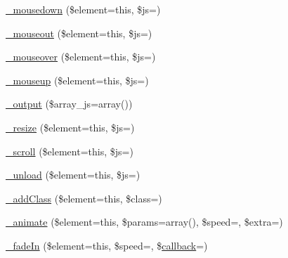 \begin{DoxyCompactItemize}
\item 
\mbox{\hyperlink{class_c_i___jquery_a95cb3f44c2413b0fbe51734b346f4d92}{\+\_\+mousedown}} (\$element=\textquotesingle{}this\textquotesingle{}, \$js=\textquotesingle{}\textquotesingle{})
\item 
\mbox{\hyperlink{class_c_i___jquery_a8a575b3b64cda3a24434e8fed1553124}{\+\_\+mouseout}} (\$element=\textquotesingle{}this\textquotesingle{}, \$js=\textquotesingle{}\textquotesingle{})
\item 
\mbox{\hyperlink{class_c_i___jquery_abe38c17415cf07abb6de435525676dca}{\+\_\+mouseover}} (\$element=\textquotesingle{}this\textquotesingle{}, \$js=\textquotesingle{}\textquotesingle{})
\item 
\mbox{\hyperlink{class_c_i___jquery_a78d654cce0aaa6de766809e56b727261}{\+\_\+mouseup}} (\$element=\textquotesingle{}this\textquotesingle{}, \$js=\textquotesingle{}\textquotesingle{})
\item 
\mbox{\hyperlink{class_c_i___jquery_a6a837913fb7adb3e611aa97a89d56a6e}{\+\_\+output}} (\$array\+\_\+js=array())
\item 
\mbox{\hyperlink{class_c_i___jquery_a6a056a14d5944d85fa6e198c609df475}{\+\_\+resize}} (\$element=\textquotesingle{}this\textquotesingle{}, \$js=\textquotesingle{}\textquotesingle{})
\item 
\mbox{\hyperlink{class_c_i___jquery_a8242a35dd382dd24e4bb7eaba2be2982}{\+\_\+scroll}} (\$element=\textquotesingle{}this\textquotesingle{}, \$js=\textquotesingle{}\textquotesingle{})
\item 
\mbox{\hyperlink{class_c_i___jquery_a967b2d5e889abc76a2389f2c34df14f7}{\+\_\+unload}} (\$element=\textquotesingle{}this\textquotesingle{}, \$js=\textquotesingle{}\textquotesingle{})
\item 
\mbox{\hyperlink{class_c_i___jquery_ac51392df39f9adbe6638324664c6319e}{\+\_\+add\+Class}} (\$element=\textquotesingle{}this\textquotesingle{}, \$class=\textquotesingle{}\textquotesingle{})
\item 
\mbox{\hyperlink{class_c_i___jquery_a0bec4feda29c0c883eccf40af8545c8c}{\+\_\+animate}} (\$element=\textquotesingle{}this\textquotesingle{}, \$params=array(), \$speed=\textquotesingle{}\textquotesingle{}, \$extra=\textquotesingle{}\textquotesingle{})
\item 
\mbox{\hyperlink{class_c_i___jquery_a2d323b3e6a8e62d1a940cbf58e216992}{\+\_\+fade\+In}} (\$element=\textquotesingle{}this\textquotesingle{}, \$speed=\textquotesingle{}\textquotesingle{}, \$\mbox{\hyperlink{_functions_8php_ae2242eb47799ca6a822b022dc1bd1ac9}{callback}}=\textquotesingle{}\textquotesingle{})

\end{DoxyCompactItemize}
